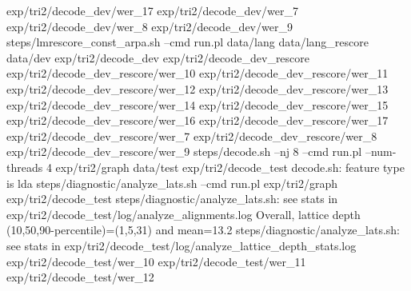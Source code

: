 exp/tri2/decode_dev/wer_17
exp/tri2/decode_dev/wer_7
exp/tri2/decode_dev/wer_8
exp/tri2/decode_dev/wer_9
steps/lmrescore_const_arpa.sh --cmd run.pl data/lang data/lang_rescore data/dev exp/tri2/decode_dev exp/tri2/decode_dev_rescore
exp/tri2/decode_dev_rescore/wer_10
exp/tri2/decode_dev_rescore/wer_11
exp/tri2/decode_dev_rescore/wer_12
exp/tri2/decode_dev_rescore/wer_13
exp/tri2/decode_dev_rescore/wer_14
exp/tri2/decode_dev_rescore/wer_15
exp/tri2/decode_dev_rescore/wer_16
exp/tri2/decode_dev_rescore/wer_17
exp/tri2/decode_dev_rescore/wer_7
exp/tri2/decode_dev_rescore/wer_8
exp/tri2/decode_dev_rescore/wer_9
steps/decode.sh --nj 8 --cmd run.pl --num-threads 4 exp/tri2/graph data/test exp/tri2/decode_test
decode.sh: feature type is lda
steps/diagnostic/analyze_lats.sh --cmd run.pl exp/tri2/graph exp/tri2/decode_test
steps/diagnostic/analyze_lats.sh: see stats in exp/tri2/decode_test/log/analyze_alignments.log
Overall, lattice depth (10,50,90-percentile)=(1,5,31) and mean=13.2
steps/diagnostic/analyze_lats.sh: see stats in exp/tri2/decode_test/log/analyze_lattice_depth_stats.log
exp/tri2/decode_test/wer_10
exp/tri2/decode_test/wer_11
exp/tri2/decode_test/wer_12
